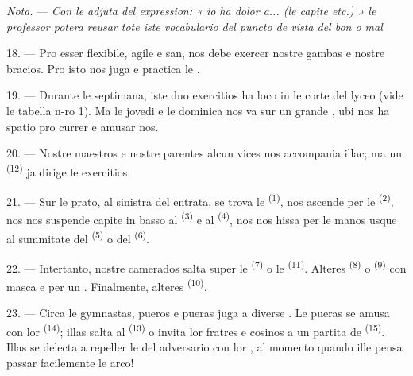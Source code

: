 \textit{Nota.} --- \textit{Con le adjuta del expression: « io ha dolor a... (le
capite etc.) » le professor potera reusar tote iste vocabulario del puncto de
vista del bon o mal} 

\VUsaut{5.0mm}
\VUsaut{2.4mm}
\VUsaut{3.0mm}

18. --- Pro esser flexibile, agile e san, nos debe exercer nostre gambas e
nostre bracios. Pro isto nos juga e practica le .

19. --- Durante le septimana, iste duo exercitios ha loco in le corte del lyceo
(vide le tabella n-ro 1). Ma le jovedi e le dominica nos va sur un grande
, ubi nos ha spatio pro currer e amusar nos.

20. --- Nostre maestros e nostre parentes alcun vices nos accompania illac; ma
un  \textsuperscript{(12)} ja dirige le
exercitios.

21. --- Sur le prato, al sinistra del entrata, se trova le  \textsuperscript{(1)}, nos ascende per le 
\textsuperscript{(2)}, nos nos suspende capite in basso al 
\textsuperscript{(3)} e al  \textsuperscript{(4)}, nos nos
hissa per le manos usque al summitate del 
\textsuperscript{(5)} o del  \textsuperscript{(6)}.

22. --- Intertanto, nostre camerados salta super le 
\textsuperscript{(7)} o le  \textsuperscript{(11)}.
Alteres  \textsuperscript{(8)} o 
\textsuperscript{(9)} con masca e per un . Finalmente,
alteres  \textsuperscript{(10)}.

\VUsaut{4.6mm}
\VUsaut{3.0mm}

23. --- Circa le gymnastas, pueros e pueras juga a diverse . Le
pueras se amusa con lor  \textsuperscript{(14)}; illas salta al
 \textsuperscript{(13)} o invita lor fratres e cosinos a un
partita de  \textsuperscript{(15)}. Illas se delecta a repeller
le  del adversario con lor , al
momento quando ille pensa passar facilemente le arco!

